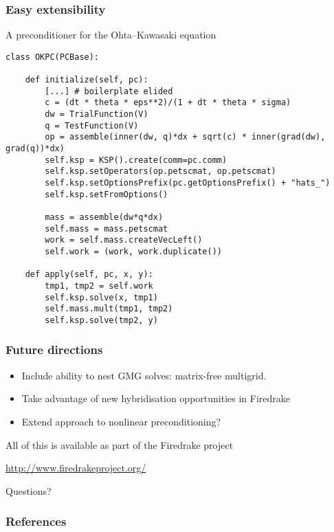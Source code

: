 \documentclass[presentation]{beamer}
\begin{document}
\begin{frame}[fragile]
  \frametitle{Easy extensibility}
  A preconditioner for the Ohta--Kawasaki equation \parencite{Farrell:2016}
\begin{verbatim}
class OKPC(PCBase):

    def initialize(self, pc):
        [...] # boilerplate elided
        c = (dt * theta * eps**2)/(1 + dt * theta * sigma)
        dw = TrialFunction(V)
        q = TestFunction(V)
        op = assemble(inner(dw, q)*dx + sqrt(c) * inner(grad(dw), grad(q))*dx)
        self.ksp = KSP().create(comm=pc.comm)
        self.ksp.setOperators(op.petscmat, op.petscmat)
        self.ksp.setOptionsPrefix(pc.getOptionsPrefix() + "hats_")
        self.ksp.setFromOptions()

        mass = assemble(dw*q*dx)
        self.mass = mass.petscmat
        work = self.mass.createVecLeft()
        self.work = (work, work.duplicate())

    def apply(self, pc, x, y):
        tmp1, tmp2 = self.work
        self.ksp.solve(x, tmp1)
        self.mass.mult(tmp1, tmp2)
        self.ksp.solve(tmp2, y)
\end{verbatim}
\end{frame}

\begin{frame}
  \frametitle{Future directions}
  \begin{itemize}
  \item Include ability to nest GMG solves: matrix-free multigrid.
  \item Take advantage of new hybridisation opportunities in Firedrake
  \item Extend approach to nonlinear preconditioning?
  \end{itemize}
  \begin{center}
    All of this is available as part of the Firedrake project

    \url{http://www.firedrakeproject.org/}
  \end{center}
\end{frame}

\begin{frame}[standout]
  Questions?
\end{frame}
\appendix
\begin{frame}[t]
  \frametitle{References}
  \printbibliography[heading=none]
\end{frame}
\end{document}

